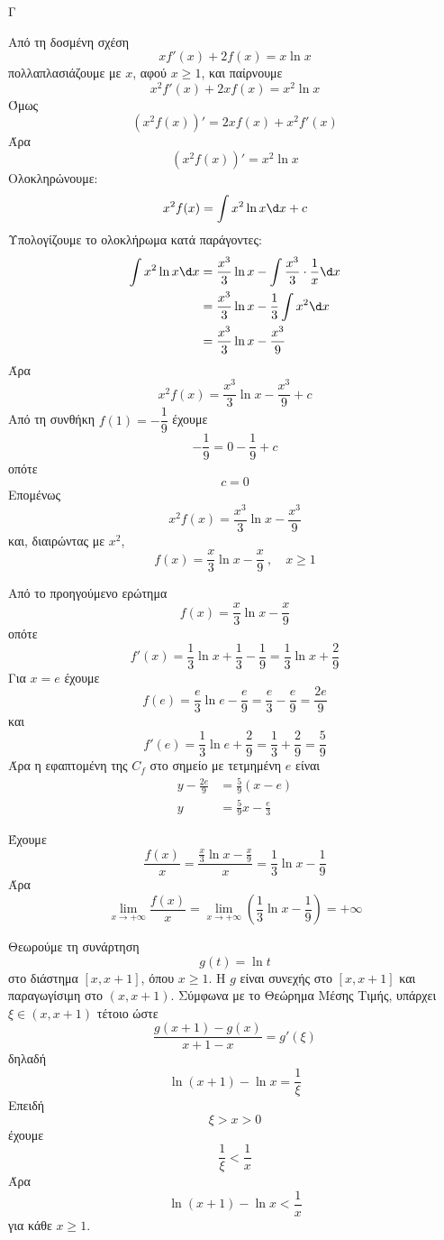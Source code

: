 \begin{thema}{Γ}
\begin{erwthma}
\item Από τη δοσμένη σχέση
\[
xf'(x)+2f(x)=x\ln x
\]
πολλαπλασιάζουμε με $x$, αφού $x\geq 1$, και παίρνουμε
\[
x^2f'(x)+2xf(x)=x^2\ln x
\]
Όμως
\[
\left(x^2f(x)\right)'=2xf(x)+x^2f'(x)
\]
Άρα
\[
\left(x^2f(x)\right)'=x^2\ln x
\]
Ολοκληρώνουμε:
\[
x^2f(x)=\dint x^2\ln x\d x+c
\]
Υπολογίζουμε το ολοκλήρωμα κατά παράγοντες:
\begin{align*}
\dint x^2\ln x\d x
&=\frac{x^3}{3}\ln x-\dint \frac{x^3}{3}\cdot\frac{1}{x}\d x\\
&=\frac{x^3}{3}\ln x-\frac{1}{3}\dint x^2\d x\\
&=\frac{x^3}{3}\ln x-\frac{x^3}{9}
\end{align*}
Άρα
\[
x^2f(x)=\frac{x^3}{3}\ln x-\frac{x^3}{9}+c
\]
Από τη συνθήκη $f(1)=-\dfrac{1}{9}$ έχουμε
\[
-\frac{1}{9}=0-\frac{1}{9}+c
\]
οπότε
\[
c=0
\]
Επομένως
\[
x^2f(x)=\frac{x^3}{3}\ln x-\frac{x^3}{9}
\]
και, διαιρώντας με $x^2$,
\[
f(x)=\frac{x}{3}\ln x-\frac{x}{9}\ ,\quad x\geq 1
\]

\item Από το προηγούμενο ερώτημα
\[
f(x)=\frac{x}{3}\ln x-\frac{x}{9}
\]
οπότε
\[
f'(x)=\frac{1}{3}\ln x+\frac{1}{3}-\frac{1}{9}
=\frac{1}{3}\ln x+\frac{2}{9}
\]
Για $x=e$ έχουμε
\[
f(e)=\frac{e}{3}\ln e-\frac{e}{9}
=\frac{e}{3}-\frac{e}{9}
=\frac{2e}{9}
\]
και
\[
f'(e)=\frac{1}{3}\ln e+\frac{2}{9}
=\frac{1}{3}+\frac{2}{9}
=\frac{5}{9}
\]
Άρα η εφαπτομένη της $C_f$ στο σημείο με τετμημένη $e$ είναι
\begin{align*}
y-\frac{2e}{9}&=\frac{5}{9}(x-e)\\
y&=\frac{5}{9}x-\frac{e}{3}
\end{align*}

\item Έχουμε
\[
\frac{f(x)}{x}
=\frac{\frac{x}{3}\ln x-\frac{x}{9}}{x}
=\frac{1}{3}\ln x-\frac{1}{9}
\]
Άρα
\[
\lim\limits_{x\to+\infty}\frac{f(x)}{x}
=\lim\limits_{x\to+\infty}\left(\frac{1}{3}\ln x-\frac{1}{9}\right)
=+\infty
\]

\item Θεωρούμε τη συνάρτηση
\[
g(t)=\ln t
\]
στο διάστημα $[x,x+1]$, όπου $x\geq 1$.
Η $g$ είναι συνεχής στο $[x,x+1]$ και παραγωγίσιμη στο $(x,x+1)$.
Σύμφωνα με το Θεώρημα Μέσης Τιμής, υπάρχει $\xi\in(x,x+1)$ τέτοιο ώστε
\[
\frac{g(x+1)-g(x)}{x+1-x}=g'(\xi)
\]
δηλαδή
\[
\ln(x+1)-\ln x=\frac{1}{\xi}
\]
Επειδή
\[
\xi>x>0
\]
έχουμε
\[
\frac{1}{\xi}<\frac{1}{x}
\]
Άρα
\[
\ln(x+1)-\ln x<\frac{1}{x}
\]
για κάθε $x\geq 1$.
\end{erwthma}
\end{thema}

